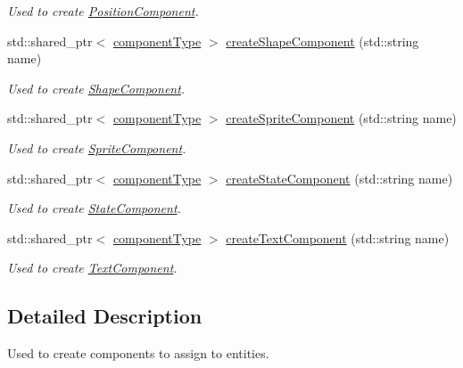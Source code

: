 \begin{DoxyCompactItemize}
\begin{DoxyCompactList}\small\item\em Used to create \hyperlink{class_position_component}{Position\-Component}. \end{DoxyCompactList}\item 
std\-::shared\-\_\-ptr$<$ \hyperlink{_abstract_component_8h_a2fb71c745bae7eefb130b6bd26fec141}{component\-Type} $>$ \hyperlink{class_component_factory_a35fe0e71de9a5eceda762748618c266a}{create\-Shape\-Component} (std\-::string name)
\begin{DoxyCompactList}\small\item\em Used to create \hyperlink{class_shape_component}{Shape\-Component}. \end{DoxyCompactList}\item 
std\-::shared\-\_\-ptr$<$ \hyperlink{_abstract_component_8h_a2fb71c745bae7eefb130b6bd26fec141}{component\-Type} $>$ \hyperlink{class_component_factory_a522a29c5da7c4aff6aa655ab97a5598f}{create\-Sprite\-Component} (std\-::string name)
\begin{DoxyCompactList}\small\item\em Used to create \hyperlink{class_sprite_component}{Sprite\-Component}. \end{DoxyCompactList}\item 
std\-::shared\-\_\-ptr$<$ \hyperlink{_abstract_component_8h_a2fb71c745bae7eefb130b6bd26fec141}{component\-Type} $>$ \hyperlink{class_component_factory_a1965122e60a497971be191b69381e0cc}{create\-State\-Component} (std\-::string name)
\begin{DoxyCompactList}\small\item\em Used to create \hyperlink{class_state_component}{State\-Component}. \end{DoxyCompactList}\item 
std\-::shared\-\_\-ptr$<$ \hyperlink{_abstract_component_8h_a2fb71c745bae7eefb130b6bd26fec141}{component\-Type} $>$ \hyperlink{class_component_factory_a4d855504433e7962c2a91a76272f020a}{create\-Text\-Component} (std\-::string name)
\begin{DoxyCompactList}\small\item\em Used to create \hyperlink{class_text_component}{Text\-Component}. \end{DoxyCompactList}\end{DoxyCompactItemize}


\subsection{Detailed Description}
Used to create components to assign to entities. 

